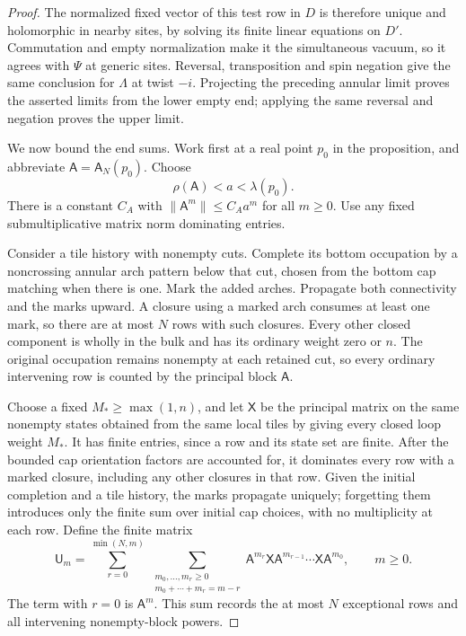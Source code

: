 \begin{proof}
The normalized fixed vector of this test row in \(D\) is therefore unique and holomorphic in nearby sites, by solving its finite linear equations on \(D'\). Commutation and empty normalization make it the simultaneous vacuum, so it agrees with \(\Psi\) at generic sites. Reversal, transposition and spin negation give the same conclusion for \(\Lambda\) at twist \(-i\). Projecting the preceding annular limit proves the asserted limits from the lower empty end; applying the same reversal and negation proves the upper limit.

We now bound the end sums. Work first at a real point \(p_0\) in the proposition, and abbreviate \(\mathsf A=\mathsf A_N(p_0)\). Choose
\[
 \rho(\mathsf A)<a<\lambda(p_0).
\]
There is a constant \(C_A\) with \(\|\mathsf A^m\|\le C_Aa^m\) for all \(m\ge0\). Use any fixed submultiplicative matrix norm dominating entries.

Consider a tile history with nonempty cuts. Complete its bottom occupation by a noncrossing annular arch pattern below that cut, chosen from the bottom cap matching when there is one. Mark the added arches. Propagate both connectivity and the marks upward. A closure using a marked arch consumes at least one mark, so there are at most \(N\) rows with such closures. Every other closed component is wholly in the bulk and has its ordinary weight zero or \(n\). The original occupation remains nonempty at each retained cut, so every ordinary intervening row is counted by the principal block \(\mathsf A\).

Choose a fixed \(M_*\ge\max(1,n)\), and let \(\mathsf X\) be the principal matrix on the same nonempty states obtained from the same local tiles by giving every closed loop weight \(M_*\). It has finite entries, since a row and its state set are finite. After the bounded cap orientation factors are accounted for, it dominates every row with a marked closure, including any other closures in that row. Given the initial completion and a tile history, the marks propagate uniquely; forgetting them introduces only the finite sum over initial cap choices, with no multiplicity at each row. Define the finite matrix
\[
 \mathsf U_m=
 \sum_{r=0}^{\min(N,m)}
 \ \sum_{\substack{m_0,\ldots,m_r\ge0\\m_0+\cdots+m_r=m-r}}
 \mathsf A^{m_r}\mathsf X\mathsf A^{m_{r-1}}
       \cdots\mathsf X\mathsf A^{m_0},
 \qquad m\ge0.
\]
The term with \(r=0\) is \(\mathsf A^m\). This sum records the at most \(N\) exceptional rows and all intervening nonempty-block powers.


\end{proof}
